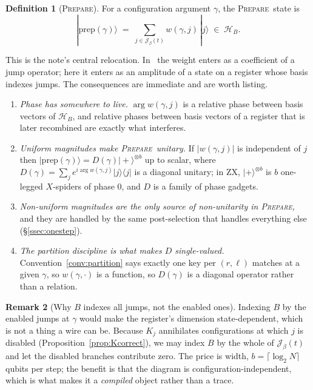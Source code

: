 \documentclass[11pt]{article}
\theoremstyle{definition}
\newtheorem{definition}{Definition}[section]
\newtheorem{remark}[definition]{Remark}
\theoremstyle{plain}
\newcommand{\Hs}{\mathcal{H}}
\newcommand{\Hb}{\Hs_{B}}
\newcommand{\Jumps}{\mathcal{J}}
\newcommand{\PREP}{\textsc{Prepare}}
\newcommand{\ket}[1]{| #1 \rangle}
\newcommand{\ketbra}[2]{| #1 \rangle\langle #2 |}
\begin{document}
\begin{definition}[\PREP]\label{def:prepare}
For a configuration argument $\gamma$, the \PREP\ state is
\[
  \ket{\mathrm{prep}(\gamma)} \;=\; \sum_{j \in \Jumps_\beta(t)} w(\gamma, j)\,\ket{j} \;\in\; \Hb .
\]
\end{definition}

This is the note's central relocation. In~\cite{weighted} the weight enters as a coefficient of
a jump operator; here it enters as an amplitude of a state on a register whose basis indexes
jumps. The consequences are immediate and are worth listing.

\begin{enumerate}[leftmargin=*]
  \item \emph{Phase has somewhere to live.} $\arg w(\gamma,j)$ is a relative phase between basis
        vectors of $\Hb$, and relative phases between basis vectors of a register that is later
        recombined are exactly what interferes.
  \item \emph{Uniform magnitudes make \PREP\ unitary.} If $|w(\gamma,j)|$ is independent of $j$
        then $\ket{\mathrm{prep}(\gamma)} = D(\gamma)\ket{+}^{\otimes b}$ up to scalar, where
        $D(\gamma) = \sum_j e^{i\arg w(\gamma,j)}\ketbra{j}{j}$ is a diagonal unitary; in ZX,
        $\ket{+}^{\otimes b}$ is $b$ one-legged $X$-spiders of phase $0$, and $D$ is a family of
        phase gadgets.
  \item \emph{Non-uniform magnitudes are the only source of non-unitarity in \PREP,} and they are
        handled by the same post-selection that handles everything else
        (\S\ref{ssec:onestep}).
  \item \emph{The partition discipline is what makes $D$ single-valued.} Convention~\ref{conv:partition}
        says exactly one key per $(r,\ell)$ matches at a given $\gamma$, so
        $w(\gamma,\cdot)$ is a function, so $D(\gamma)$ is a diagonal operator rather than a
        relation.
\end{enumerate}

\begin{remark}[Why $B$ indexes all jumps, not the enabled ones]\label{rem:allj}
Indexing $B$ by the enabled jumps at $\gamma$ would make the register's dimension
state-dependent, which is not a thing a wire can be. Because $K_j$ annihilates configurations at
which $j$ is disabled (Proposition~\ref{prop:Kcorrect}), we may index $B$ by the whole of
$\Jumps_\beta(t)$ and let the disabled branches contribute zero. The price is width, $b = \lceil
\log_2 N\rceil$ qubits per step; the benefit is that the diagram is configuration-independent,
which is what makes it a \emph{compiled} object rather than a trace.
\end{remark}
\end{document}
